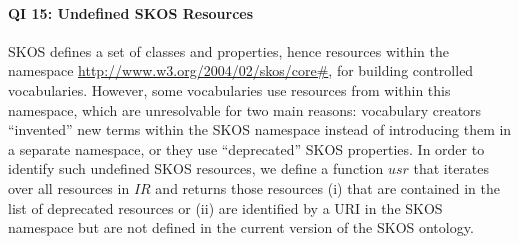 \paragraph{QI 15: Undefined SKOS Resources}

SKOS defines a set of classes and properties, hence resources within the namespace \url{http://www.w3.org/2004/02/skos/core#}, for building controlled vocabularies. However, some vocabularies use resources from within this namespace, which are unresolvable for two main reasons: vocabulary creators ``invented'' new terms within the SKOS namespace instead of introducing them in a separate namespace, or they use ``deprecated'' SKOS properties.
In order to identify such undefined SKOS resources, we define a function $usr$  that iterates over all resources in $IR$ and returns those resources (i) that are contained in the list of deprecated resources or (ii) are identified by a URI in the SKOS namespace but are not defined in the current version of the SKOS ontology.